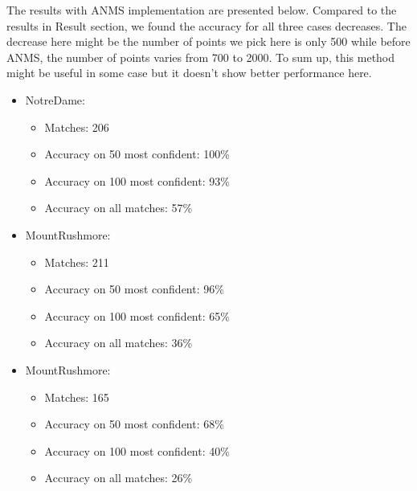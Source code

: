 \begin{enumerate}
    The results with ANMS implementation are presented below. Compared to the results in Result section, we found the accuracy for all three cases decreases. The decrease here might be the number of points we pick here is only 500 while before ANMS, the number of points varies from 700 to 2000. To sum up, this method might be useful in some case but it doesn't show better performance here.
    \begin{itemize}
        \item NotreDame:  
            \begin{itemize}
                \item Matches: 206
                \item Accuracy on 50 most confident: 100\%
                \item Accuracy on 100 most confident: 93\%
                \item Accuracy on all matches: 57\%
            \end{itemize}
        \item MountRushmore:  
            \begin{itemize}
                \item Matches: 211
                \item Accuracy on 50 most confident: 96\%
                \item Accuracy on 100 most confident: 65\%
                \item Accuracy on all matches: 36\%
            \end{itemize}
        \item MountRushmore:  
            \begin{itemize}
                \item Matches: 165
                \item Accuracy on 50 most confident: 68\%
                \item Accuracy on 100 most confident: 40\%
                \item Accuracy on all matches: 26\%
            \end{itemize}
    \end{itemize}
   

\end{enumerate}
